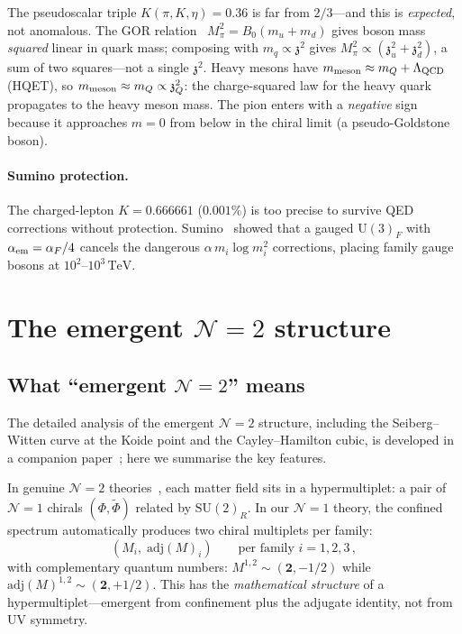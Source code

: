 \documentclass[aps,prd,twocolumn,showpacs,preprintnumbers,superscriptaddress,floatfix]{revtex4-2}
\newcommand{\SU}{\mathrm{SU}}
\newcommand{\UU}{\mathrm{U}}
\newcommand{\adj}{\mathrm{adj}}
\newcommand{\TeV}{\,\mathrm{TeV}}
\newcommand{\zch}{\mathfrak{z}}
\begin{document}
The pseudoscalar triple $K(\pi, K, \eta) = 0.36$ is far from
$2/3$---and this is \emph{expected}, not anomalous.
The GOR relation~\cite{GellMannOakesRenner:1968}
$M_\pi^2 = B_0(m_u + m_d)$ gives boson mass \emph{squared}
linear in quark mass; composing with $m_q \propto \zch^2$ gives
$M_\pi^2 \propto (\zch_u^2 + \zch_d^2)$, a sum of two
squares---not a single $\zch^2$.
Heavy mesons have $m_{\rm meson} \approx m_Q + \Lambda_{\rm QCD}$
(HQET), so $m_{\rm meson} \approx m_Q \propto \zch_Q^2$: the
charge-squared law for the heavy quark propagates to the heavy
meson mass.
The pion enters with a \emph{negative} sign because it approaches
$m = 0$ from below in the chiral limit (a pseudo-Goldstone
boson).

\paragraph{Sumino protection.}
The charged-lepton $K = 0.666661$ ($0.001\%$) is too precise to
survive QED corrections without protection.
Sumino~\cite{Sumino:2009} showed that a gauged $\UU(3)_F$ with
$\alpha_{\rm em} = \alpha_F/4$ cancels the dangerous
$\alpha\,m_i\log m_i^2$ corrections, placing family gauge bosons
at $10^2$--$10^3\TeV$.


\section{The emergent $\mathcal{N}{=}2$ structure}
\label{sec:N2}

\subsection{What ``emergent $\mathcal{N}{=}2$'' means}

The detailed analysis of the emergent $\mathcal{N}{=}2$ structure,
including the Seiberg--Witten curve at the Koide point and the
Cayley--Hamilton cubic, is developed in a companion
paper~\cite{companion:N2}; here we summarise the key features.

In genuine $\mathcal{N}{=}2$ theories~\cite{SeibergWitten:1994},
each matter field sits in a hypermultiplet: a pair of
$\mathcal{N}{=}1$ chirals $(\Phi, \tilde\Phi)$ related by
$\SU(2)_R$.
In our $\mathcal{N}{=}1$ theory, the confined spectrum
automatically produces two chiral multiplets per family:
\begin{equation}
  (M_i, \;\adj(M)_i)
  \qquad\text{per family } i = 1, 2, 3\,,
\end{equation}
with complementary quantum numbers:
$M^{1,2} \sim (\mathbf{2}, -1/2)$ while
$\adj(M)^{1,2} \sim (\mathbf{2}, +1/2)$.
This has the \emph{mathematical structure} of a
hypermultiplet---emergent from confinement plus the adjugate
identity, not from UV symmetry.
\end{document}
